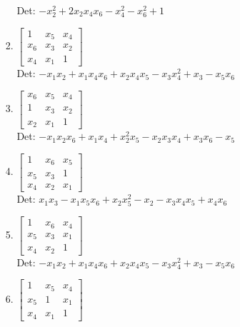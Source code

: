 \documentclass[12pt]{article}
\begin{document}
\begin{enumerate}
\begin{enumerate}
\begin{enumerate}
Det: $- x_{2}^{2} + 2 x_{2} x_{4} x_{6} - x_{4}^{2} - x_{6}^{2} + 1$\\


\item $\displaystyle \left[\begin{matrix}1 & x_{5} & x_{4}\\x_{6} & x_{3} & x_{2}\\x_{4} & x_{1} & 1\end{matrix}\right]$\\

Det: $- x_{1} x_{2} + x_{1} x_{4} x_{6} + x_{2} x_{4} x_{5} - x_{3} x_{4}^{2} + x_{3} - x_{5} x_{6}$\\


\item $\displaystyle \left[\begin{matrix}x_{6} & x_{5} & x_{4}\\1 & x_{3} & x_{2}\\x_{2} & x_{1} & 1\end{matrix}\right]$\\

Det: $- x_{1} x_{2} x_{6} + x_{1} x_{4} + x_{2}^{2} x_{5} - x_{2} x_{3} x_{4} + x_{3} x_{6} - x_{5}$\\


\item $\displaystyle \left[\begin{matrix}1 & x_{6} & x_{5}\\x_{5} & x_{3} & 1\\x_{4} & x_{2} & x_{1}\end{matrix}\right]$\\

Det: $x_{1} x_{3} - x_{1} x_{5} x_{6} + x_{2} x_{5}^{2} - x_{2} - x_{3} x_{4} x_{5} + x_{4} x_{6}$\\


\item $\displaystyle \left[\begin{matrix}1 & x_{6} & x_{4}\\x_{5} & x_{3} & x_{1}\\x_{4} & x_{2} & 1\end{matrix}\right]$\\

Det: $- x_{1} x_{2} + x_{1} x_{4} x_{6} + x_{2} x_{4} x_{5} - x_{3} x_{4}^{2} + x_{3} - x_{5} x_{6}$\\


\item $\displaystyle \left[\begin{matrix}1 & x_{5} & x_{4}\\x_{5} & 1 & x_{1}\\x_{4} & x_{1} & 1\end{matrix}\right]$\\


\end{enumerate}
\end{enumerate}
\end{enumerate}
\end{document}
